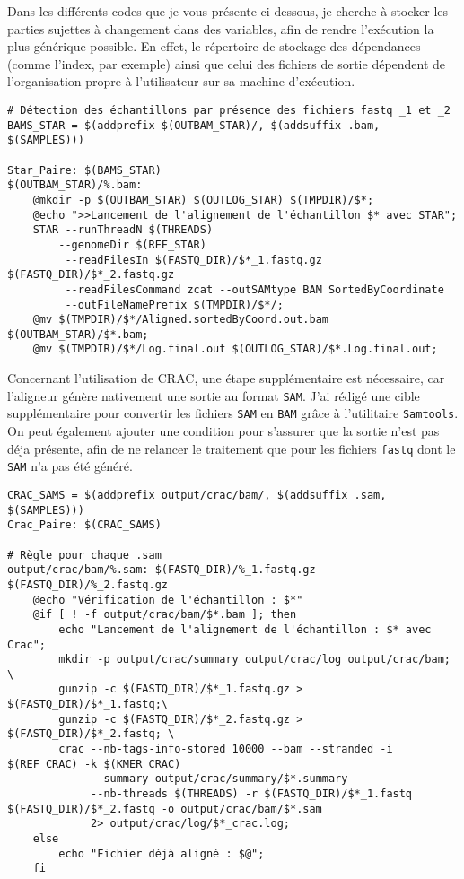 Dans les différents codes que je vous présente ci-dessous, je cherche à stocker les parties sujettes à changement dans des variables, afin de rendre l’exécution la plus générique possible. 
En effet, le répertoire de stockage des dépendances (comme l’index, par exemple) ainsi que celui des fichiers de sortie dépendent de l’organisation propre à l’utilisateur sur sa machine d’exécution.

\begin{lstlisting}[style=makefileStyle, label={lst:STARAlign}, caption={\underline{Cible \texttt{Star\_Paire} pour générer les \texttt{BAM} avec STAR}}]
# Détection des échantillons par présence des fichiers fastq _1 et _2
BAMS_STAR = $(addprefix $(OUTBAM_STAR)/, $(addsuffix .bam, $(SAMPLES)))

Star_Paire: $(BAMS_STAR)
$(OUTBAM_STAR)/%.bam:
	@mkdir -p $(OUTBAM_STAR) $(OUTLOG_STAR) $(TMPDIR)/$*;
	@echo ">>Lancement de l'alignement de l'échantillon $* avec STAR";
	STAR --runThreadN $(THREADS)  
		--genomeDir $(REF_STAR)  
		 --readFilesIn $(FASTQ_DIR)/$*_1.fastq.gz $(FASTQ_DIR)/$*_2.fastq.gz 
		 --readFilesCommand zcat --outSAMtype BAM SortedByCoordinate 
		 --outFileNamePrefix $(TMPDIR)/$*/;
	@mv $(TMPDIR)/$*/Aligned.sortedByCoord.out.bam $(OUTBAM_STAR)/$*.bam;
	@mv $(TMPDIR)/$*/Log.final.out $(OUTLOG_STAR)/$*.Log.final.out;
\end{lstlisting}

Concernant l'utilisation de CRAC, une étape supplémentaire est nécessaire, car l'aligneur génère nativement une sortie au format \texttt{SAM}.  
J'ai rédigé une cible supplémentaire pour convertir les fichiers \texttt{SAM} en \texttt{BAM} grâce à l'utilitaire \texttt{Samtools}.  
On peut également ajouter une condition pour s'assurer que la sortie n'est pas déja présente,  
afin de ne relancer le traitement que pour les fichiers \texttt{fastq} dont le \texttt{SAM} n'a pas été généré.

\begin{lstlisting}[style=makefileStyle, label={lst:CRACAlign}, caption={\underline{Cible \texttt{Crac\_Paire} pour générer les \texttt{BAM} avec CRAC}}]
CRAC_SAMS = $(addprefix output/crac/bam/, $(addsuffix .sam, $(SAMPLES)))
Crac_Paire: $(CRAC_SAMS)

# Règle pour chaque .sam
output/crac/bam/%.sam: $(FASTQ_DIR)/%_1.fastq.gz $(FASTQ_DIR)/%_2.fastq.gz
	@echo "Vérification de l'échantillon : $*"
	@if [ ! -f output/crac/bam/$*.bam ]; then 
	    echo "Lancement de l'alignement de l'échantillon : $* avec Crac"; 
	    mkdir -p output/crac/summary output/crac/log output/crac/bam; \
	    gunzip -c $(FASTQ_DIR)/$*_1.fastq.gz > $(FASTQ_DIR)/$*_1.fastq;\ 
	    gunzip -c $(FASTQ_DIR)/$*_2.fastq.gz > $(FASTQ_DIR)/$*_2.fastq; \
	    crac --nb-tags-info-stored 10000 --bam --stranded -i $(REF_CRAC) -k $(KMER_CRAC) 
	    	 --summary output/crac/summary/$*.summary
	         --nb-threads $(THREADS) -r $(FASTQ_DIR)/$*_1.fastq $(FASTQ_DIR)/$*_2.fastq -o output/crac/bam/$*.sam
	         2> output/crac/log/$*_crac.log;
	else 
	    echo "Fichier déjà aligné : $@"; 
	fi
\end{lstlisting}

